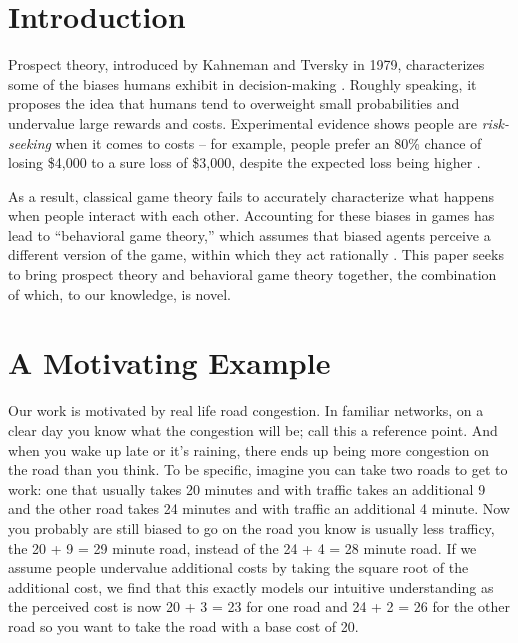 \documentclass[twoside]{article}
\begin{document}
\begin{multicols}{2} %

\section{Introduction}
Prospect theory, introduced by Kahneman and Tversky in 1979, characterizes some
of the biases humans exhibit in decision-making \cite{Kahneman1979}. Roughly
speaking, it proposes the idea that humans tend to overweight small
probabilities and undervalue large rewards and costs. Experimental evidence
shows people are \textit{risk-seeking} when it comes to costs -- for example,
people prefer an 80\% chance of losing \$4,000 to a sure loss of \$3,000,
despite the expected loss being higher \cite{Kahneman1979}.

As a result, classical game theory fails to accurately characterize what happens
when people interact with each other. Accounting for these biases in games has
lead to ``behavioral game theory,'' which assumes that biased agents perceive a
different version of the game, within which they act rationally \cite{Meir2014}.
This paper seeks to bring prospect theory and behavioral game theory together,
the combination of which, to our knowledge, is novel.

\section{A Motivating Example}
Our work is motivated by real life road congestion.  In familiar networks, on a clear day you know what the congestion will be; call this a reference point.  And when you wake up late or it's raining, there ends up being more congestion on the road than you think.  To be specific, imagine you can take two roads to get to work: one that usually takes 20 minutes and with traffic takes an additional 9 and the other road takes 24 minutes and with traffic an additional 4 minute.  Now you probably are still biased to go on the road you know is usually less trafficy, the 20 + 9 = 29 minute road, instead of the 24 + 4 = 28 minute road.  If we assume people undervalue additional costs by taking the square root of the additional cost, we find that this exactly models our intuitive understanding as the perceived cost is now 20 + 3 = 23 for one road and 24 + 2 = 26 for the other road so you want to take the road with a base cost of 20.


\end{multicols}
\end{document}
